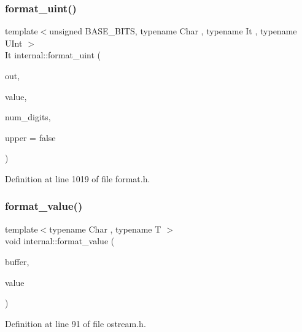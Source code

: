 \subsubsection{\texorpdfstring{format\+\_\+uint()}{format\_uint()}\hspace{0.1cm}{\footnotesize\ttfamily [2/2]}}
{\footnotesize\ttfamily template$<$unsigned B\+A\+S\+E\+\_\+\+B\+I\+TS, typename Char , typename It , typename U\+Int $>$ \\
It internal\+::format\+\_\+uint (\begin{DoxyParamCaption}\item[{It}]{out,  }\item[{U\+Int}]{value,  }\item[{int}]{num\+\_\+digits,  }\item[{bool}]{upper = {\ttfamily false} }\end{DoxyParamCaption})\hspace{0.3cm}{\ttfamily [inline]}}



Definition at line 1019 of file format.\+h.

\mbox{\label{namespaceinternal_a1be3f9974ada7afa2fc121fd6cf13521}} 
\subsubsection{\texorpdfstring{format\+\_\+value()}{format\_value()}}
{\footnotesize\ttfamily template$<$typename Char , typename T $>$ \\
void internal\+::format\+\_\+value (\begin{DoxyParamCaption}\item[{\hyperlink{classinternal_1_1basic__buffer}{basic\+\_\+buffer}$<$ Char $>$ \&}]{buffer,  }\item[{const T \&}]{value }\end{DoxyParamCaption})}



Definition at line 91 of file ostream.\+h.

